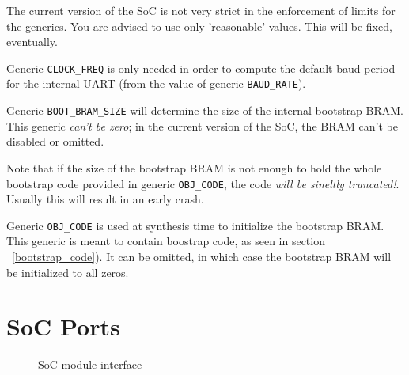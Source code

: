 The current version of the SoC is not very strict in the enforcement of limits 
for the generics. You are advised to use only 'reasonable' values. This will 
be fixed, eventually.

Generic \texttt{CLOCK\_FREQ} is only needed in order to compute the default 
baud period for the internal UART (from the value of generic \texttt{BAUD\_RATE}).


Generic \texttt{BOOT\_BRAM\_SIZE} will determine the size of the internal 
bootstrap BRAM. This generic \emph{can't be zero}; in the current version of
the SoC, the BRAM can't be disabled or omitted.

Note that if the size of the bootstrap BRAM is not enough to hold the whole 
bootstrap code provided in generic \texttt{OBJ\_CODE}, the code \emph{will 
be sineltly truncated!}. Usually this will result in an early crash.

Generic \texttt{OBJ\_CODE} is used at synthesis time to initialize the bootstrap
BRAM. This generic is meant to contain boostrap code, as seen in section 
~\ref{bootstrap_code}). It can be omitted, in which case the bootstrap BRAM
will be initialized to all zeros.


\section{SoC Ports}
\label{soc_ports}

\begin{figure}[h]
\caption{SoC module interface\label{soc_symbol}}
\end{figure}

